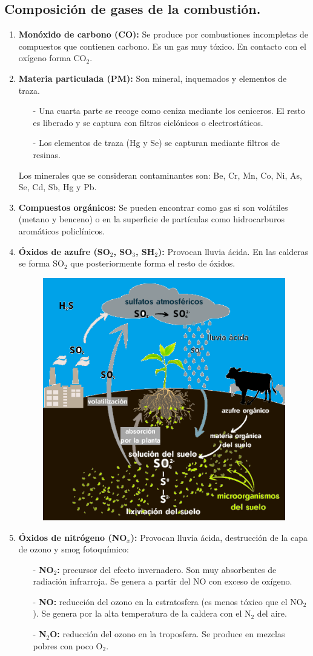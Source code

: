 \subsection{Composición de gases de la combustión.}
\begin{enumerate}
	\item \textbf{Monóxido de carbono (CO):}
		Se produce por combustiones incompletas de compuestos que contienen carbono. Es un gas muy tóxico. En contacto con el oxígeno forma CO$_2$.
	\item \textbf{Materia particulada (PM):}
		Son mineral, inquemados y elementos de traza.
		\begin{itemize}
			\item [-] Una cuarta parte se recoge como ceniza mediante los ceniceros. El resto es liberado y se captura con filtros ciclónicos o electrostáticos.
			\item [-] Los elementos de traza (Hg y Se) se capturan mediante filtros de resinas.
		\end{itemize}
		Los minerales que se consideran contaminantes son:  Be, Cr, Mn, Co, Ni, As, Se, Cd, Sb, Hg y Pb.
	\item \textbf{Compuestos orgánicos:}
		Se pueden encontrar como gas si son volátiles (metano y benceno) o en la superficie de partículas como hidrocarburos aromáticos policlínicos.
	\item \textbf{Óxidos de azufre (SO$_2$, SO$_3$, SH$_2$):}
		Provocan lluvia ácida. En las calderas se forma SO$_2$ que posteriormente forma el resto de óxidos.
		\begin{figure}[H]
			\centering
			\includegraphics[width=0.4\linewidth]{res/tema2/sicloazufgre}
			\label{fig:sicloazufgre}
		\end{figure}
		
	\item \textbf{Óxidos de nitrógeno (NO$_x$):}
		Provocan lluvia ácida, destrucción de la capa de ozono y smog fotoquímico:
		\begin{itemize}
			\item [-] \textbf{NO$_2$:} precursor del efecto invernadero. Son muy absorbentes de radiación infrarroja. Se genera a partir del NO con exceso de oxígeno.
			\item [-] \textbf{NO:} reducción del ozono en la estratosfera (es menos tóxico que el NO$_2$). Se genera por la alta temperatura de la caldera con el N$_2$ del aire. 
			\item [-] \textbf{N$_2$O:} reducción del ozono en la troposfera. Se produce en mezclas pobres con poco O$_2$.
		\end{itemize}
\end{enumerate}
